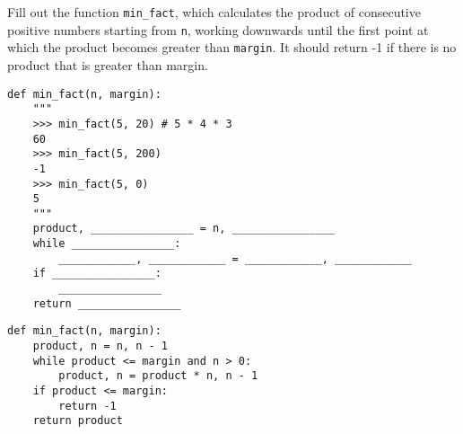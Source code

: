 \question Fill out the function \lstinline{min_fact}, which calculates the product of consecutive positive numbers starting from \lstinline{n}, working downwards until the first point at which the product becomes greater than \lstinline{margin}. It should return -1 if there is no product that is greater than margin.

\begin{blocksection}
\begin{lstlisting}
def min_fact(n, margin):
    """
    >>> min_fact(5, 20) # 5 * 4 * 3
    60
    >>> min_fact(5, 200)
    -1
    >>> min_fact(5, 0)
    5
    """
    product, ________________ = n, ________________
    while ________________:
        ____________, ____________ = ____________, ____________
    if ________________:
        ________________
    return ________________

\end{lstlisting}
\end{blocksection}

\begin{blocksection}
\begin{solution}
\begin{lstlisting}
def min_fact(n, margin):
    product, n = n, n - 1
    while product <= margin and n > 0:
        product, n = product * n, n - 1
    if product <= margin:
        return -1
    return product
\end{lstlisting}
\end{solution}
\end{blocksection}